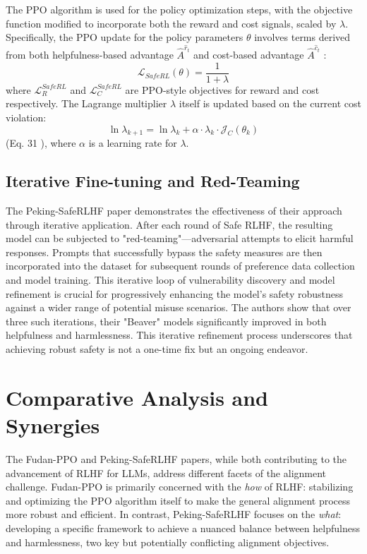 \documentclass{article} %
\begin{document}
The PPO algorithm is used for the policy optimization steps, with the objective function modified to incorporate both the reward and cost signals, scaled by $\lambda$. Specifically, the PPO update for the policy parameters $\theta$ involves terms derived from both helpfulness-based advantage $\hat{A}^{\hat{r}_t}$ and cost-based advantage $\hat{A}^{\hat{c}_t}$ \cite{Dai2023SafeRLHF}:
$$ \mathcal{L}_{SafeRL}(\theta) = \frac{1}{1+\lambda} $$
where $\mathcal{L}_{R}^{SafeRL}$ and $\mathcal{L}_{C}^{SafeRL}$ are PPO-style objectives for reward and cost respectively. The Lagrange multiplier $\lambda$ itself is updated based on the current cost violation:
$$ \ln \lambda_{k+1} = \ln \lambda_k + \alpha \cdot \lambda_k \cdot \mathcal{J}_C(\theta_k) $$
(Eq. 31 \cite{Dai2023SafeRLHF}), where $\alpha$ is a learning rate for $\lambda$.

\subsection{Iterative Fine-tuning and Red-Teaming}
The Peking-SafeRLHF paper demonstrates the effectiveness of their approach through iterative application. After each round of Safe RLHF, the resulting model can be subjected to "red-teaming"—adversarial attempts to elicit harmful responses. Prompts that successfully bypass the safety measures are then incorporated into the dataset for subsequent rounds of preference data collection and model training. \cite{Dai2023SafeRLHF} This iterative loop of vulnerability discovery and model refinement is crucial for progressively enhancing the model's safety robustness against a wider range of potential misuse scenarios. The authors show that over three such iterations, their "Beaver" models significantly improved in both helpfulness and harmlessness. \cite{Dai2023SafeRLHF} This iterative refinement process underscores that achieving robust safety is not a one-time fix but an ongoing endeavor.

\section{Comparative Analysis and Synergies}
\label{sec:comparative}

The Fudan-PPO \cite{Zheng2023PPO} and Peking-SafeRLHF \cite{Dai2023SafeRLHF} papers, while both contributing to the advancement of RLHF for LLMs, address different facets of the alignment challenge. Fudan-PPO is primarily concerned with the \textit{how} of RLHF: stabilizing and optimizing the PPO algorithm itself to make the general alignment process more robust and efficient. In contrast, Peking-SafeRLHF focuses on the \textit{what}: developing a specific framework to achieve a nuanced balance between helpfulness and harmlessness, two key but potentially conflicting alignment objectives.
\end{document}
